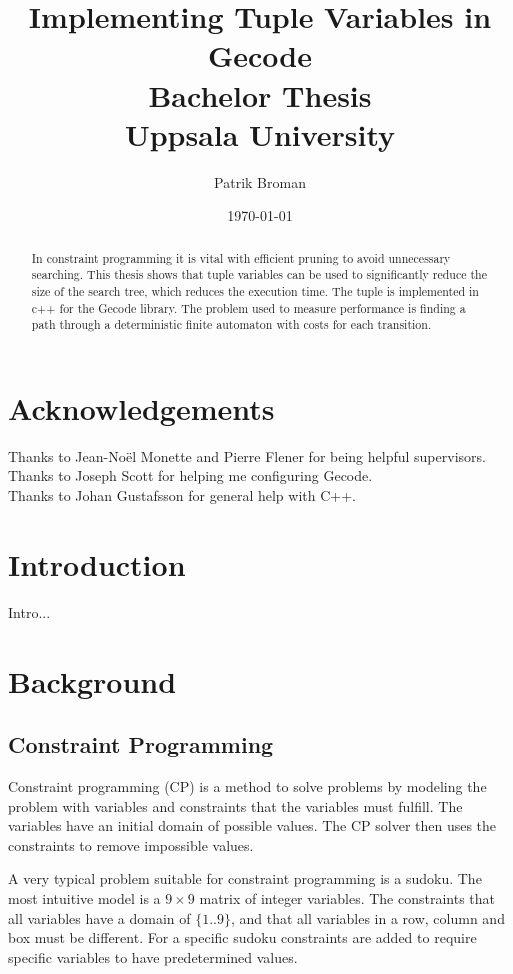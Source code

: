 \documentclass[a4paper,11pt]{article}
\title{\textbf{Implementing Tuple Variables in Gecode \\
	Bachelor Thesis \\
    Uppsala University  \\
  }
}
\author{Patrik Broman}
\date{\today}
\begin{document}
\maketitle

\begin{abstract}
In constraint programming it is vital with efficient pruning to avoid unnecessary searching. This thesis shows that tuple variables can be used to significantly reduce the size of the search tree, which reduces the execution time. The tuple is implemented in c++ for the Gecode library. The problem used to measure performance is finding a path through a deterministic finite automaton with costs for each transition.
\end{abstract}

\setcounter{tocdepth}{2}
\tableofcontents

\section*{Acknowledgements}
Thanks to Jean-No\"{e}l Monette and Pierre Flener for being helpful supervisors. \\
Thanks to Joseph Scott for helping me configuring Gecode. \\
Thanks to Johan Gustafsson for general help with C++. \\

\section{Introduction}
Intro...

\section{Background}
\subsection{Constraint Programming}

Constraint programming (CP) is a method to solve problems by modeling the problem with variables and constraints that the variables must fulfill. The variables have an initial domain of possible values. The CP solver then uses the constraints to remove impossible values. 

A very typical problem suitable for constraint programming is a sudoku. The most intuitive model is a $9\times9$ matrix of integer variables. The constraints that all variables have a domain of $\{1..9\}$, and that all variables in a row, column and box must be different. For a specific sudoku constraints are added to require specific variables to have predetermined values.
\end{document}
